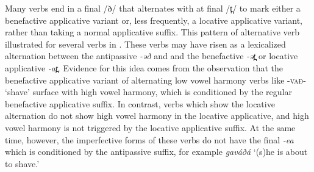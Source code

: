 Many verbs end in a final /ð/ that alternates with at final /t̪/ to mark either a benefactive applicative variant or, less frequently, a locative applicative variant, rather than taking a normal applicative suffix. This pattern of alternative verb illustrated for several verbs in . These verbs may have risen as a lexicalized alternation between the antipassive \textit{-əð} and and the benefactive \textit{-ət̪} or locative applicative \textit{-at̪}. Evidence for this idea comes from the observation that the benefactive applicative variant of alternating low vowel harmony verbs like \textsc{-vað-} `shave' surface with high vowel harmony, which is conditioned by the regular benefactive applicative suffix. In contrast, verbs which show the locative alternation do not show high vowel harmony in the locative applicative, and high vowel harmony is not triggered by the locative applicative suffix. At the same time, however, the imperfective forms of these verbs do not have the final \textit{-ea} which is conditioned by the antipassive suffix, for example \textit{gaváðá} `(s)he is about to shave.'

